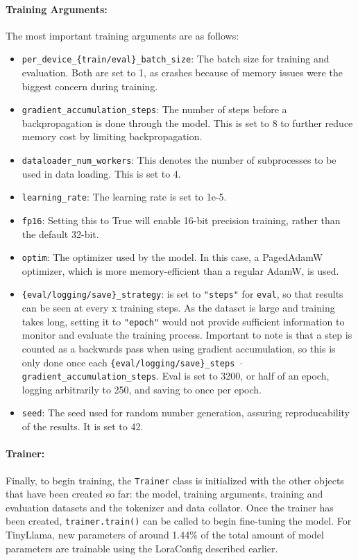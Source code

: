 \paragraph{Training Arguments:}
The most important training arguments are as follows:
\begin{itemize}
    \item \texttt{per\_device\_\{train/eval\}\_batch\_size}: The batch size for training and evaluation. Both are set to 1, as crashes because of memory issues were the biggest concern during training.
    \item \texttt{gradient\_accumulation\_steps}: The number of steps before a backpropagation is done through the model. This is set to 8 to further reduce memory cost by limiting backpropagation.
    \item \texttt{dataloader\_num\_workers}: This denotes the number of subprocesses to be used in data loading. This is set to 4.
    \item \texttt{learning\_rate}: The learning rate is set to 1e-5.
    \item \texttt{fp16}: Setting this to True will enable 16-bit precision training, rather than the default 32-bit.
    \item \texttt{optim}: The optimizer used by the model. In this case, a PagedAdamW optimizer, which is more memory-efficient than a regular AdamW, is used.
    \item \texttt{\{eval/logging/save\}\_strategy}: is set to \texttt{"steps"} for \texttt{eval}, so that results can be seen at every x training steps. As the dataset is large and training takes long, setting it to \texttt{"epoch"} would not provide sufficient information to monitor and evaluate the training process.
    Important to note is that a step is counted as a backwards pass when using gradient accumulation, so this is only done once each \texttt{\{eval/logging/save\}\_steps $\cdot$ gradient\_accumulation\_steps}. Eval is set to 3200, or half of an epoch, logging arbitrarily to 250, and saving to once per epoch.
    \item \texttt{seed}: The seed used for random number generation, assuring reproducability of the results. It is set to 42.
\end{itemize}

\paragraph{Trainer:}
Finally, to begin training, the \texttt{Trainer} class is initialized with the other objects that have been created so far: the model, training arguments, training and evaluation datasets and the tokenizer and data collator.
Once the trainer has been created, \texttt{trainer.train()} can be called to begin fine-tuning the model.
For TinyLlama, new parameters of around 1.44\% of the total amount of model parameters are trainable using the LoraConfig described earlier.


